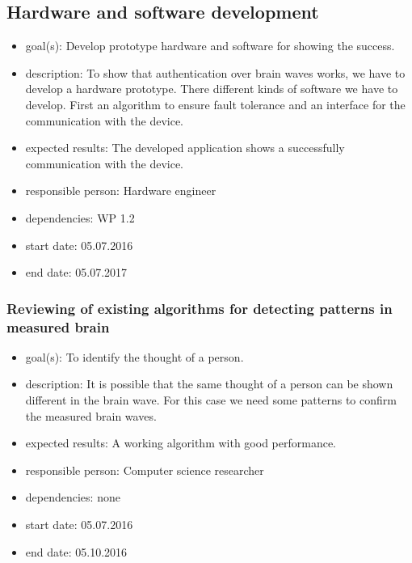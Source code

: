 \subsection{Hardware and software development}
\begin{itemize}
 \item goal(s): Develop prototype hardware and software for showing the success.
 \item description: To show that authentication over brain waves works, we have to develop a hardware prototype. There different kinds of software we have to develop. First an algorithm to ensure fault tolerance and an interface for the communication with the device.
 \item expected results: The developed application shows a successfully communication with the device.
 \item responsible person: Hardware engineer
 \item dependencies: WP 1.2
 \item start date: 05.07.2016
 \item end date: 05.07.2017
\end{itemize}

\subsubsection{Reviewing of existing algorithms for detecting patterns in measured brain}
\begin{itemize}
 \item goal(s): To identify the thought of a person.
 \item description: It is possible that the same thought of a person can be shown different in the brain wave. For this case we need some patterns to confirm the measured brain waves.
 \item expected results: A working algorithm with good performance.
 \item responsible person: Computer science researcher
 \item dependencies: none
 \item start date: 05.07.2016
 \item end date: 05.10.2016
\end{itemize}

